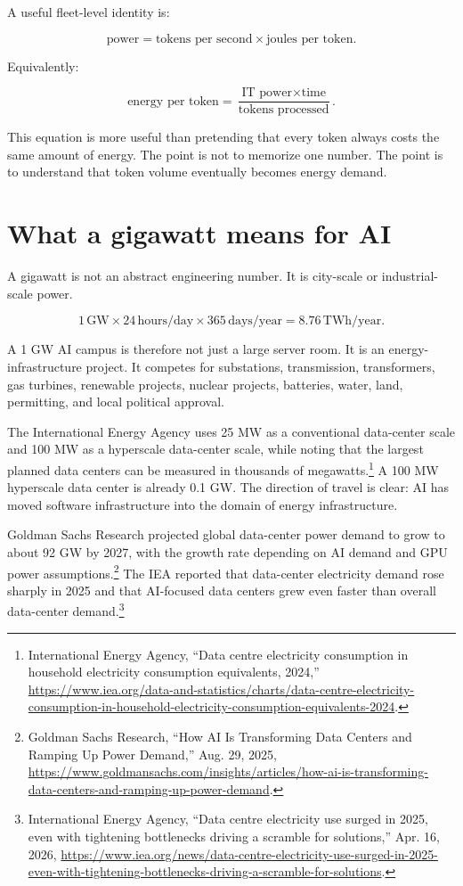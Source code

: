 A useful fleet-level identity is:

\[
\text{power} = \text{tokens per second} \times \text{joules per token}.
\]

Equivalently:

\[
\text{energy per token} = \frac{\text{IT power} \times \text{time}}{\text{tokens processed}}.
\]

This equation is more useful than pretending that every token always costs the same amount of energy. The point is not to memorize one number. The point is to understand that token volume eventually becomes energy demand.

\section{What a gigawatt means for AI}

A gigawatt is not an abstract engineering number. It is city-scale or industrial-scale power.

\[
1\,\text{GW} \times 24\,\text{hours/day} \times 365\,\text{days/year} = 8.76\,\text{TWh/year}.
\]

A 1 GW AI campus is therefore not just a large server room. It is an energy-infrastructure project. It competes for substations, transmission, transformers, gas turbines, renewable projects, nuclear projects, batteries, water, land, permitting, and local political approval.

The International Energy Agency uses 25 MW as a conventional data-center scale and 100 MW as a hyperscale data-center scale, while noting that the largest planned data centers can be measured in thousands of megawatts.\footnote{International Energy Agency, ``Data centre electricity consumption in household electricity consumption equivalents, 2024,'' \url{https://www.iea.org/data-and-statistics/charts/data-centre-electricity-consumption-in-household-electricity-consumption-equivalents-2024}.} A 100 MW hyperscale data center is already 0.1 GW. The direction of travel is clear: AI has moved software infrastructure into the domain of energy infrastructure.

Goldman Sachs Research projected global data-center power demand to grow to about 92 GW by 2027, with the growth rate depending on AI demand and GPU power assumptions.\footnote{Goldman Sachs Research, ``How AI Is Transforming Data Centers and Ramping Up Power Demand,'' Aug. 29, 2025, \url{https://www.goldmansachs.com/insights/articles/how-ai-is-transforming-data-centers-and-ramping-up-power-demand}.} The IEA reported that data-center electricity demand rose sharply in 2025 and that AI-focused data centers grew even faster than overall data-center demand.\footnote{International Energy Agency, ``Data centre electricity use surged in 2025, even with tightening bottlenecks driving a scramble for solutions,'' Apr. 16, 2026, \url{https://www.iea.org/news/data-centre-electricity-use-surged-in-2025-even-with-tightening-bottlenecks-driving-a-scramble-for-solutions}.}


